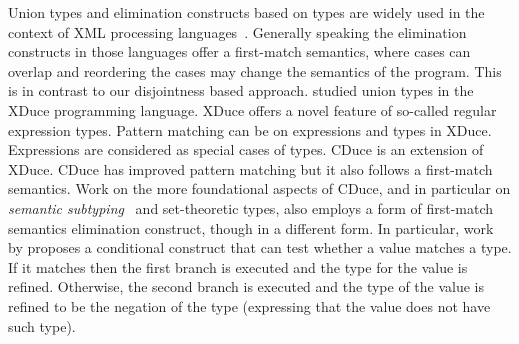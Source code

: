 \begin{comment}
\citet{freeman1991refinement} studied union types along with intersection types
in setting of refinement types for ML. Main focus of their work is to infer
more precise types of expressions, which they call
refinement types. Their work is targeted to contribute for the types
in ML and not for the expressions. Therefore, they did not define
expressions and dynamic semantics. On the contrary, our work provides
a complete calculus with type sound dynamic semantics.
\bruno{and ... Do they have an elimination construct for unions?
  If so how is that related to our work?}.
\baber{I added few more lines in Freeman citation.}
\end{comment}
Union types and elimination constructs based on types are
widely used in the context of XML processing languages~\cite{hosoya2003xduce,benzaken2003cduce}.
Generally speaking the elimination constructs in those
languages offer a first-match semantics,
where cases can overlap and reordering the cases may change the semantics of the program.
This is in contrast to our disjointness based approach.
\citet{hosoya2003xduce} studied union types
in the XDuce programming language. XDuce offers a novel feature of
so-called regular expression types. Pattern matching can be on
expressions and types in XDuce.  Expressions are considered as special
cases of types.  CDuce
\cite{benzaken2003cduce} is an extension of XDuce. CDuce has improved
pattern matching but it also
follows a first-match semantics. Work on the more foundational aspects
of CDuce, and in particular on \emph{semantic subtyping}~\cite{frisch2002semantic}
and set-theoretic types,
also employs a form of first-match semantics elimination construct, though in a different form.
In particular, work by \citet{castagna2005gentle,castagna2017gradual}
proposes a conditional construct that can test whether a value matches a type.
If it matches then the first branch is executed and the type for the value is refined.
Otherwise, the second branch is executed and the type of the value is refined to be
the negation of the type (expressing that the value does not have such type).
